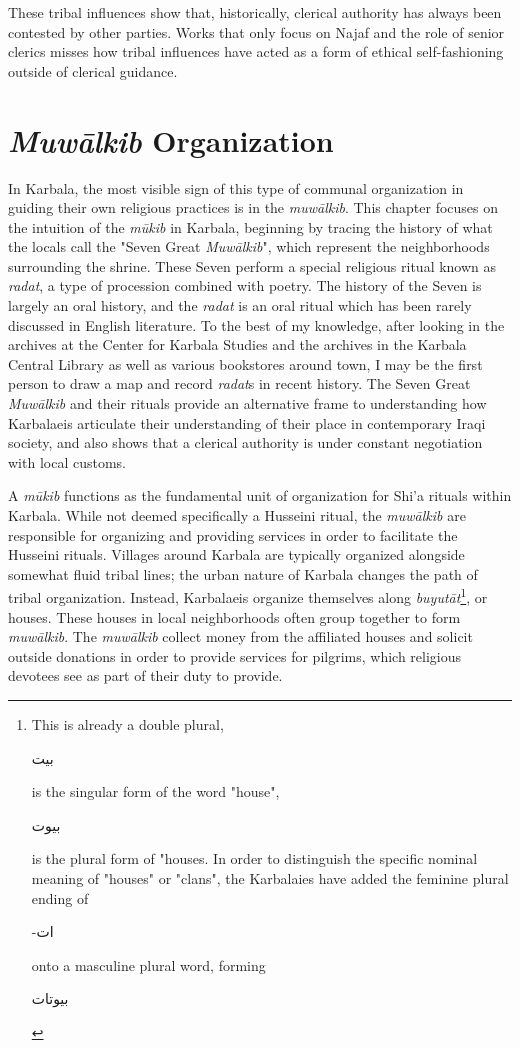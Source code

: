 These tribal influences show that, historically, clerical authority has always been contested by other parties. Works that only focus on Najaf and the role of senior clerics misses how tribal influences have acted as a form of ethical self-fashioning outside of clerical guidance. 


\section{\emph{Muwālkib} Organization}
In Karbala, the most visible sign of this type of communal organization in guiding their own religious practices is in the \emph{muwālkib}. This chapter focuses on the intuition of the \emph{mūkib} in Karbala, beginning by tracing the history of what the locals call the "Seven Great \emph{Muwālkib}", which represent the neighborhoods surrounding the shrine. These Seven perform a special religious ritual known as \emph{radat}, a type of procession combined with poetry. The history of the Seven is largely an oral history, and the \emph{radat} is an oral ritual which has been rarely discussed in English literature. To the best of my knowledge, after looking in the archives at the Center for Karbala Studies and the archives in the Karbala Central Library as well as various bookstores around town, I may be the first person to draw a map and record \emph{radat}s in recent history. The Seven Great \emph{Muwālkib} and their rituals provide an alternative frame to understanding how Karbalaeis articulate their understanding of their place in contemporary Iraqi society, and also shows that a clerical authority is under constant negotiation with local customs. 

A \emph{mūkib} functions as the fundamental unit of organization for Shi’a rituals within Karbala. While not deemed specifically a Husseini ritual, the \emph{muwālkib} are responsible for organizing and providing services in order to facilitate the Husseini rituals. Villages around Karbala are typically organized alongside somewhat fluid tribal lines; the urban nature of Karbala changes the path of tribal organization. Instead, Karbalaeis organize themselves along \emph{buyutāt}\footnote{This is already a double plural, \begin{Arabic}بيت\end{Arabic} is the singular form of the word "house", \begin{Arabic}
    بيوت
\end{Arabic} is the plural form of "houses. In order to distinguish the specific nominal meaning of "houses" or "clans", the Karbalaies have added the feminine plural ending of \begin{Arabic}
    -ات
\end{Arabic} onto a masculine plural word, forming \begin{Arabic}
    بيوتات
\end{Arabic}}, or houses. These houses in local neighborhoods often group together to form \emph{muwālkib}. The \emph{muwālkib} collect money from the affiliated houses and solicit outside donations in order to provide services for pilgrims, which religious devotees see as part of their duty to provide. 

